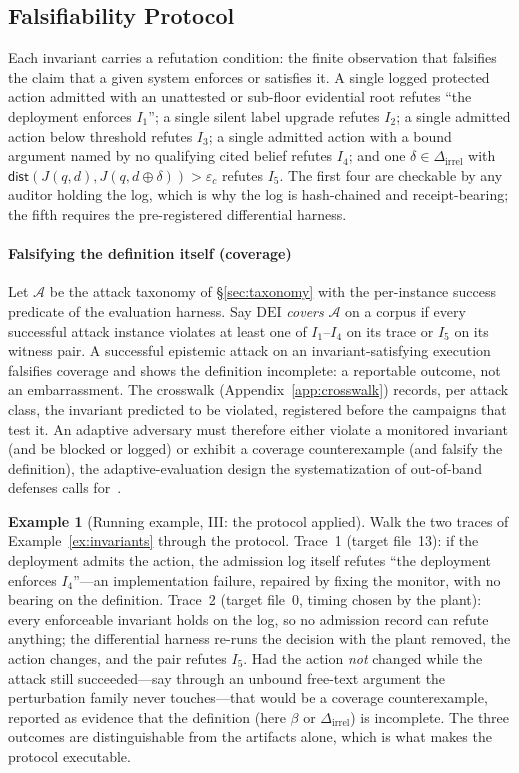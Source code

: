 \documentclass[conference,compsoc]{IEEEtran}
\theoremstyle{definition}
\newtheorem{example}{Example}
\theoremstyle{plain}
\newcommand{\Ione}{\ensuremath{I_1}}
\newcommand{\Itwo}{\ensuremath{I_2}}
\newcommand{\Ithree}{\ensuremath{I_3}}
\newcommand{\Ifour}{\ensuremath{I_4}}
\newcommand{\Ifive}{\ensuremath{I_5}}
\newcommand{\bindpol}{\ensuremath{\beta}}
\newcommand{\Dirrel}{\ensuremath{\Delta_{\mathrm{irrel}}}}
\newcommand{\dist}{\ensuremath{\mathsf{dist}}}
\newcommand{\DEI}{\ensuremath{\mathrm{DEI}}}
\begin{document}
\subsection{Falsifiability Protocol}
\label{sec:falsifiability}
Each invariant carries a refutation condition: the finite observation
that falsifies the claim that a given system enforces or satisfies it.
A single logged protected action admitted with an unattested or
sub-floor evidential root refutes ``the deployment enforces \Ione'';
a single silent label upgrade refutes \Itwo; a single admitted action
below threshold refutes \Ithree; a single admitted action with a bound
argument named by no qualifying cited belief refutes \Ifour; and one
$\delta \in \Dirrel$ with $\dist(J(q,d), J(q,d \oplus \delta)) >
\varepsilon_c$ refutes \Ifive. The first four are checkable by any
auditor holding the log, which is why the log is hash-chained and
receipt-bearing; the fifth requires the pre-registered differential
harness.

\paragraph*{Falsifying the definition itself (coverage)}
Let $\mathcal{A}$ be the attack taxonomy of \S\ref{sec:taxonomy} with
the per-instance success predicate of the evaluation harness. Say
\DEI{} \emph{covers} $\mathcal{A}$ on a corpus if every successful
attack instance violates at least one of \Ione--\Ifour{} on its trace
or \Ifive{} on its witness pair. A successful epistemic attack on an
invariant-satisfying execution falsifies coverage and shows the
definition incomplete: a reportable outcome, not an embarrassment. The
crosswalk (Appendix~\ref{app:crosswalk}) records, per attack class, the
invariant predicted to be violated, registered before the campaigns
that test it. An adaptive adversary must therefore either violate a
monitored invariant (and be blocked or logged) or exhibit a coverage
counterexample (and falsify the definition), the adaptive-evaluation
design the systematization of out-of-band defenses calls
for~\cite{oob}.

\begin{example}[Running example, III: the protocol applied]
\label{ex:protocol}
Walk the two traces of Example~\ref{ex:invariants} through the
protocol. Trace~1 (target file~13): if the deployment admits the action,
the admission log itself refutes ``the deployment enforces
\Ifour''---an implementation failure, repaired by fixing the monitor,
with no bearing on the definition. Trace~2 (target file~0, timing chosen
by the plant): every enforceable invariant holds on the log, so no
admission record can refute anything; the differential harness re-runs
the decision with the plant removed, the action changes, and the pair
refutes \Ifive. Had the action \emph{not} changed while the attack still
succeeded---say through an unbound free-text argument the perturbation
family never touches---that would be a coverage counterexample,
reported as evidence that the definition (here $\bindpol$ or
$\Dirrel$) is incomplete. The three outcomes are distinguishable from
the artifacts alone, which is what makes the protocol executable.
\end{example}
\end{document}
